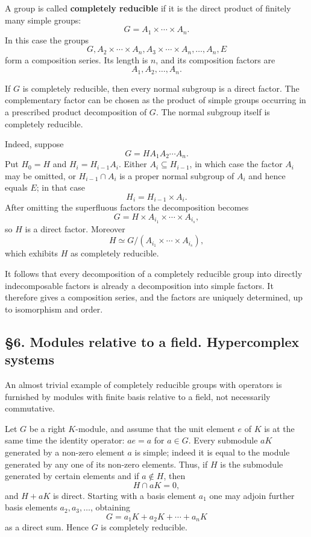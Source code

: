 \documentclass[11pt]{article}
\begin{document}
A group is called \textbf{completely reducible} if it is the direct
product of finitely many simple groups: \[
  G=A_1\times\cdots\times A_n.
\] In this case the groups \[
  G,
  A_2\times\cdots\times A_n,
  A_3\times\cdots\times A_n,
  \ldots,
  A_n,
  E
\] form a composition series. Its length is \(n\), and its composition
factors are \[
  A_1,A_2,\ldots,A_n.
\]

If \(G\) is completely reducible, then every normal subgroup is a direct
factor. The complementary factor can be chosen as the product of simple
groups occurring in a prescribed product decomposition of \(G\). The
normal subgroup itself is completely reducible.

Indeed, suppose \[
  G=H A_1A_2\cdots A_n.
\] Put \(H_0=H\) and \(H_i=H_{i-1}A_i\). Either
\(A_i\subseteq H_{i-1}\), in which case the factor \(A_i\) may be
omitted, or \(H_{i-1}\cap A_i\) is a proper normal subgroup of \(A_i\)
and hence equals \(E\); in that case \[
  H_i=H_{i-1}\times A_i.
\] After omitting the superfluous factors the decomposition becomes \[
  G=H\times A_{i_1}\times\cdots\times A_{i_s},
\] so \(H\) is a direct factor. Moreover \[
  H\simeq G/(A_{i_1}\times\cdots\times A_{i_s}),
\] which exhibits \(H\) as completely reducible.

It follows that every decomposition of a completely reducible group into
directly indecomposable factors is already a decomposition into simple
factors. It therefore gives a composition series, and the factors are
uniquely determined, up to isomorphism and order.

\subsection{§6. Modules relative to a field. Hypercomplex
systems}\label{modules-relative-to-a-field.-hypercomplex-systems}

An almost trivial example of completely reducible groups with operators
is furnished by modules with finite basis relative to a field, not
necessarily commutative.

Let \(G\) be a right \(K\)-module, and assume that the unit element
\(e\) of \(K\) is at the same time the identity operator: \(ae=a\) for
\(a\in G\). Every submodule \(aK\) generated by a non-zero element \(a\)
is simple; indeed it is equal to the module generated by any one of its
non-zero elements. Thus, if \(H\) is the submodule generated by certain
elements and if \(a\notin H\), then \[
  H\cap aK=0,
\] and \(H+aK\) is direct. Starting with a basis element \(a_1\) one may
adjoin further basis elements \(a_2,a_3,\ldots\), obtaining \[
  G=a_1K+a_2K+\cdots+a_nK
\] as a direct sum. Hence \(G\) is completely reducible.
\end{document}
